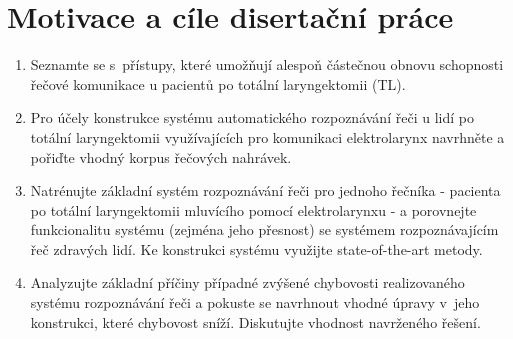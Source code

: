 \chapter{Motivace a cíle disertační práce}
\label{chap:mot}

\begin{enumerate}
  \item Seznamte se s~přístupy, které umožňují alespoň částečnou obnovu schopnosti řečové komunikace u pacientů po totální laryngektomii (TL).
  \item Pro účely konstrukce systému automatického rozpoznávání řeči u lidí po totální laryngektomii využívajících pro komunikaci elektrolarynx navrhněte a pořiďte vhodný korpus řečových nahrávek.
  \item Natrénujte základní systém rozpoznávání řeči pro jednoho řečníka - pacienta po totální laryngektomii mluvícího pomocí elektrolarynxu - a porovnejte funkcionalitu systému (zejména jeho přesnost) se systémem rozpoznávajícím řeč zdravých lidí. Ke konstrukci systému využijte state-of-the-art metody.
  \item Analyzujte základní příčiny případné zvýšené chybovosti realizovaného systému rozpoznávání řeči a pokuste se navrhnout vhodné úpravy v~jeho konstrukci, které chybovost sníží. Diskutujte vhodnost navrženého řešení.
\end{enumerate}
